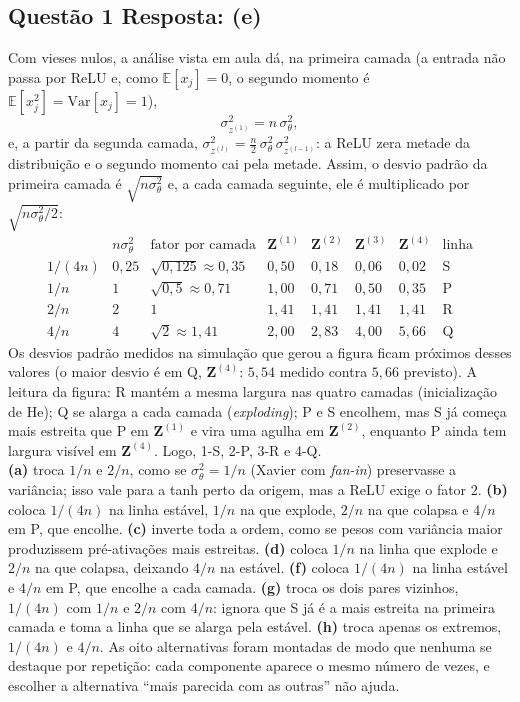 \documentclass[11pt,a4paper]{article}
\begin{document}
\subsection*{Questão 1 \textemdash{} Resposta: (e)}
Com vieses nulos, a análise vista em aula dá, na primeira camada (a entrada não passa por ReLU e, como $\mathbb{E}[x_j] = 0$, o segundo momento é $\mathbb{E}[x_j^2] = \mathrm{Var}[x_j] = 1$),
\[
\sigma^2_{z^{(1)}} = n\,\sigma_\theta^2 ,
\]
e, a partir da segunda camada, $\sigma^2_{z^{(l)}} = \tfrac{n}{2}\,\sigma_\theta^2\,\sigma^2_{z^{(l-1)}}$: a ReLU zera metade da distribuição e o segundo momento cai pela metade. Assim, o desvio padrão da primeira camada é $\sqrt{n\sigma_\theta^2}$ e, a cada camada seguinte, ele é multiplicado por $\sqrt{n\sigma_\theta^2/2}$:
\[
\begin{array}{c|c|c|cccc|c}
 & n\sigma_\theta^2 & \text{fator por camada} & \mathbf{Z}^{(1)} & \mathbf{Z}^{(2)} & \mathbf{Z}^{(3)} & \mathbf{Z}^{(4)} & \text{linha}\\\hline
1/(4n) & 0{,}25 & \sqrt{0{,}125} \approx 0{,}35 & 0{,}50 & 0{,}18 & 0{,}06 & 0{,}02 & \text{S}\\
1/n & 1 & \sqrt{0{,}5} \approx 0{,}71 & 1{,}00 & 0{,}71 & 0{,}50 & 0{,}35 & \text{P}\\
2/n & 2 & 1 & 1{,}41 & 1{,}41 & 1{,}41 & 1{,}41 & \text{R}\\
4/n & 4 & \sqrt{2} \approx 1{,}41 & 2{,}00 & 2{,}83 & 4{,}00 & 5{,}66 & \text{Q}
\end{array}
\]
Os desvios padrão medidos na simulação que gerou a figura ficam próximos desses valores (o maior desvio é em Q, $\mathbf{Z}^{(4)}$: $5{,}54$ medido contra $5{,}66$ previsto). A leitura da figura: R mantém a mesma largura nas quatro camadas (inicialização de He); Q se alarga a cada camada (\textit{exploding}); P e S encolhem, mas S já começa mais estreita que P em $\mathbf{Z}^{(1)}$ e vira uma agulha em $\mathbf{Z}^{(2)}$, enquanto P ainda tem largura visível em $\mathbf{Z}^{(4)}$. Logo, 1-S, 2-P, 3-R e 4-Q.\\
\textbf{(a)} troca $1/n$ e $2/n$, como se $\sigma_\theta^2 = 1/n$ (Xavier com \textit{fan-in}) preservasse a variância; isso vale para a tanh perto da origem, mas a ReLU exige o fator $2$.
\textbf{(b)} coloca $1/(4n)$ na linha estável, $1/n$ na que explode, $2/n$ na que colapsa e $4/n$ em P, que encolhe.
\textbf{(c)} inverte toda a ordem, como se pesos com variância maior produzissem pré-ativações mais estreitas.
\textbf{(d)} coloca $1/n$ na linha que explode e $2/n$ na que colapsa, deixando $4/n$ na estável.
\textbf{(f)} coloca $1/(4n)$ na linha estável e $4/n$ em P, que encolhe a cada camada.
\textbf{(g)} troca os dois pares vizinhos, $1/(4n)$ com $1/n$ e $2/n$ com $4/n$: ignora que S já é a mais estreita na primeira camada e toma a linha que se alarga pela estável.
\textbf{(h)} troca apenas os extremos, $1/(4n)$ e $4/n$.
As oito alternativas foram montadas de modo que nenhuma se destaque por repetição: cada componente aparece o mesmo número de vezes, e escolher a alternativa ``mais parecida com as outras'' não ajuda.
\end{document}
